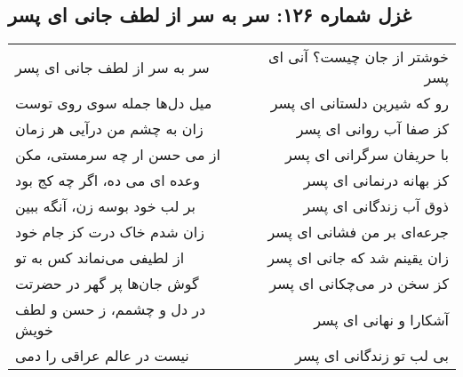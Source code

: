 \begin{center}
\section*{غزل شماره ۱۲۶: سر به سر از لطف جانی ای پسر}
\label{sec:126}
\begin{longtable}{l p{0.5cm} r}
سر به سر از لطف جانی ای پسر
&&
خوشتر از جان چیست؟ آنی ای پسر
\\
میل دل‌ها جمله سوی روی توست
&&
رو که شیرین دلستانی ای پسر
\\
زان به چشم من درآیی هر زمان
&&
کز صفا آب روانی ای پسر
\\
از می حسن ار چه سرمستی، مکن
&&
با حریفان سرگرانی ای پسر
\\
وعده ای می ده، اگر چه کج بود
&&
کز بهانه درنمانی ای پسر
\\
بر لب خود بوسه زن، آنگه ببین
&&
ذوق آب زندگانی ای پسر
\\
زان شدم خاک درت کز جام خود
&&
جرعه‌ای بر من فشانی ای پسر
\\
از لطیفی می‌نماند کس به تو
&&
زان یقینم شد که جانی ای پسر
\\
گوش جان‌ها پر گهر در حضرتت
&&
کز سخن در می‌چکانی ای پسر
\\
در دل و چشمم، ز حسن و لطف خویش
&&
آشکارا و نهانی ای پسر
\\
نیست در عالم عراقی را دمی
&&
بی لب تو زندگانی ای پسر
\\
\end{longtable}
\end{center}
